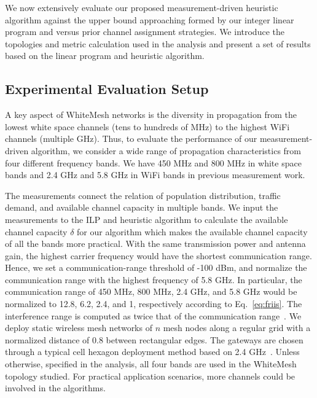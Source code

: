 We now extensively evaluate our proposed measurement-driven heuristic algorithm against the 
upper bound approaching formed by our integer linear program and versus prior channel assignment 
strategies. We introduce the topologies and metric calculation used in the analysis and present a 
set of results based on the linear program and heuristic algorithm.

\subsection{Experimental Evaluation Setup}
\label{subsec:design}
A key aspect of WhiteMesh networks is the diversity in propagation from the lowest white
space channels (tens to hundreds of MHz) to the highest WiFi channels (multiple GHz). Thus, 
to evaluate the performance of our measurement-driven algorithm, we consider a wide range 
of propagation characteristics from four different frequency bands.  
We have 450 MHz and 800 MHz in white space bands and 2.4 GHz and 5.8 GHz in WiFi bands
in previous measurement work.

The measurements connect the relation of population distribution, traffic demand,
and available channel capacity in multiple bands. We input the measurements to the ILP and heuristic 
algorithm to calculate the available channel capacity $\delta$ for our algorithm which makes the available 
channel capacity of all the bands more practical. With the same transmission power and antenna gain, the 
highest carrier frequency would have the shortest communication range. Hence, we set a communication-range 
threshold of -100 dBm, and normalize the communication range with the highest frequency of 5.8 GHz. In 
particular, the communication range of 450 MHz, 800 MHz, 2.4 GHz, and 5.8 GHz would be normalized to 12.8, 
6.2, 2.4, and 1, respectively according to Eq.~\ref{eq:friis}. The interference range is computed as twice 
that of the communication range~\cite{raniwala2005architecture}. We deploy static wireless mesh networks of 
$n$ mesh nodes along a regular grid with a normalized distance of 0.8 between rectangular edges. The gateways 
are chosen through a typical cell hexagon deployment method based on 2.4 GHz~\cite{meguerdichian2001exposure}.
Unless otherwise, specified in the analysis, all four bands are used in the WhiteMesh topology studied. For 
practical application scenarios, more channels could be involved in the algorithms.

